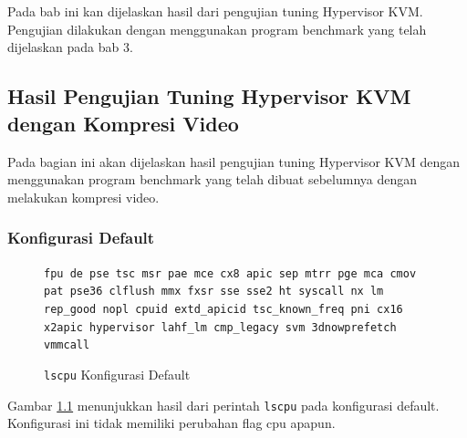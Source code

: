 \chapter{\babEmpat}
Pada bab ini kan dijelaskan hasil dari pengujian tuning Hypervisor KVM. Pengujian dilakukan dengan menggunakan program benchmark yang telah dijelaskan pada bab 3.

\section{Hasil Pengujian Tuning Hypervisor KVM dengan Kompresi Video}
Pada bagian ini akan dijelaskan hasil pengujian tuning Hypervisor KVM dengan menggunakan program benchmark yang telah dibuat sebelumnya dengan melakukan kompresi video.

\subsection{Konfigurasi Default}
\begin{figure}
    \texttt{fpu de pse tsc msr pae mce cx8 apic sep mtrr pge mca cmov pat pse36 clflush mmx fxsr sse sse2 ht syscall nx lm rep\_good nopl cpuid extd\_apicid tsc\_known\_freq pni cx16 x2apic hypervisor lahf\_lm cmp\_legacy svm 3dnowprefetch vmmcall}
    \caption{\texttt{lscpu} Konfigurasi Default}
    \label{fig:lscpu_video_compression_test_original}
\end{figure}

Gambar \ref{fig:lscpu_video_compression_test_original} menunjukkan hasil dari perintah \texttt{lscpu} pada konfigurasi default. Konfigurasi ini tidak memiliki perubahan flag cpu apapun.

